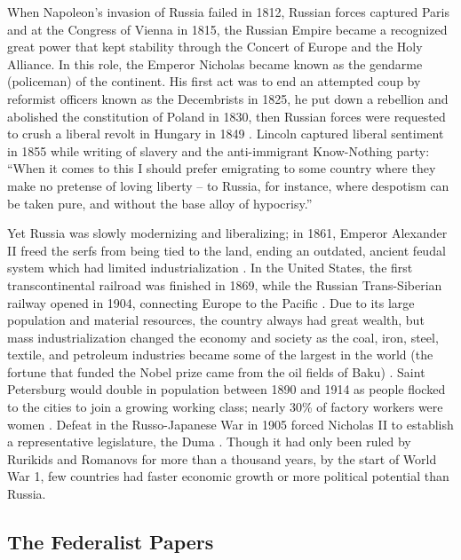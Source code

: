 When Napoleon's invasion of Russia failed in 1812, Russian forces captured Paris and at the Congress of Vienna in 1815, the Russian Empire became a recognized great power that kept stability through the Concert of Europe and the Holy Alliance.
In this role, the Emperor Nicholas became known as the gendarme (policeman) of the continent.
His first act was to end an attempted coup by reformist officers known as the Decembrists in 1825, he put down a rebellion and abolished the constitution of Poland in 1830, then Russian forces were requested to crush a liberal revolt in Hungary in 1849 \cite[p. 149-166]{bushkovitch2011}.
Lincoln captured liberal sentiment in 1855 while writing of slavery and the anti-immigrant Know-Nothing party: ``When it comes to this I should prefer emigrating to some country where they make no pretense of loving liberty – to Russia, for instance, where despotism can be taken pure, and without the base alloy of hypocrisy.'' \cite[vol. 2, p. 323]{lincoln2008}

Yet Russia was slowly modernizing and liberalizing; in 1861, Emperor Alexander II freed the serfs from being tied to the land, ending an outdated, ancient feudal system which had limited industrialization \cite[p. 189-192]{bushkovitch2011}.
In the United States, the first transcontinental railroad was finished in 1869, while the Russian Trans-Siberian railway opened in 1904, connecting Europe to the Pacific \cite{bowman1957}.
Due to its large population and material resources, the country always had great wealth, but mass industrialization changed the economy and society as the coal, iron, steel, textile, and petroleum industries became some of the largest in the world (the fortune that funded the Nobel prize came from the oil fields of Baku) \cite[pp. 837-844]{portal1965}.
Saint Petersburg would double in population between 1890 and 1914 as people flocked to the cities to join a growing working class; nearly 30\% of factory workers were women \cite[p. 208-227]{bushkovitch2011}.
Defeat in the Russo-Japanese War in 1905 forced Nicholas II to establish a representative legislature, the Duma \cite[p.269,211]{bushkovitch2011}.
Though it had only been ruled by Rurikids and Romanovs for more than a thousand years, by the start of World War 1, few countries had faster economic growth or more political potential than Russia.

\subsection{The Federalist Papers}

